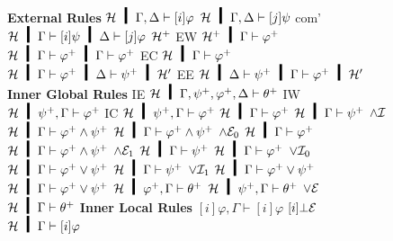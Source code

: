 \begin{figure}
 \small
  \begin{center}
  \textbf{External Rules}
   \vskip 2mm
   \BinaryRule
   {$\hyper\hmid\Gamma,\Delta\vdash[i]\varphi$}
   {$\hyper\hmid\Gamma,\Delta\vdash[j]\psi$}
   {com'}
   {$\hyper\hmid\Gamma\vdash[i]\psi\hmid\Delta\vdash[j]\varphi$}
  \hfill
 \UnaryRule
 {$\mathcal{H}^+$}
 {EW}
 {$\hyper^+\hmid\Gamma\vdash \m\varphi$}
 \vskip 2mm
 \UnaryRule
 {$\hyper\hmid\Gamma\vdash \m\varphi\hmid\Gamma\vdash \m\varphi$}
 {EC}
 {$\hyper\hmid\Gamma\vdash \m\varphi$}
 \hfill
 \UnaryRule
 {$\hyper\hmid\Gamma\vdash \m\varphi\hmid\Delta\vdash \m\psi\hmid \hyper'$}
 {EE}
 {$\hyper\hmid\Delta\vdash \m\psi   \hmid\Gamma\vdash \m\varphi\hmid
   \hyper'$}
 \vskip 2mm
\textbf{Inner Global Rules}
\vskip 2mm
   \UnaryRule{$\hyper\hmid\Gamma,\m\varphi,\m\psi,\Delta\vdash\m\theta$}
   {IE}
   {$\hyper\hmid\Gamma,\m\psi,\m\varphi,\Delta\vdash \m\theta$}
   \hfill
   \UnaryRule{$\hyper\hmid\Gamma\vdash\m\varphi$}
   {IW}
   {$\hyper\hmid\m\psi,\Gamma\vdash\m\varphi$}
   \hfill
   \UnaryRule{$\hyper\hmid\m\psi,\m\psi,\Gamma\vdash\m\varphi$}
   {IC}
   {$\hyper\hmid\m\psi,\Gamma\vdash\m\varphi$}
   \vskip 2mm
  \BinaryRule
   {$\hyper\hmid\Gamma\vdash \m\varphi$}
   {$\hyper\hmid\Gamma\vdash \m\psi$}
   {$\wedge\mathcal I$}
   {$\hyper\hmid\Gamma\vdash \m\varphi\wedge\m\psi$}
   \vskip 2mm
  \UnaryRule
   {$\hyper\hmid\Gamma\vdash \m\varphi\wedge\m\psi$}
   {$\wedge\mathcal E_0$}
   {$\hyper\hmid\Gamma\vdash \m\varphi$}
   \hfill
  \UnaryRule
   {$\hyper\hmid\Gamma\vdash\m\varphi\wedge\m\psi$}
   {$\wedge\mathcal E_1$}
   {$\hyper\hmid\Gamma\vdash\m\psi$}
\vskip 2mm
  \UnaryRule
   {$\hyper\hmid\Gamma\vdash\m\varphi$}
   {$\vee\mathcal I_0$}
   {$\hyper\hmid\Gamma\vdash\m\varphi\vee\m\psi$}
   \hfill
  \UnaryRule
   {$\hyper\hmid\Gamma\vdash\m\psi$}
   {$\vee\mathcal I_1$}
   {$\hyper\hmid\Gamma\vdash\m\varphi\vee\m\psi$}
\vskip 2mm
   \TrinaryRule
   {$\hyper\hmid\Gamma\vdash           \m\varphi\vee\m\psi$}
   {$\hyper\hmid\m\varphi, \Gamma\vdash\m\theta$}
   {$\hyper\hmid\m\psi,    \Gamma\vdash\m\theta$}
   {$\vee\mathcal E$}
   {$\hyper\hmid         \Gamma\vdash\m\theta$}
\vskip 2mm
\textbf{Inner Local Rules}
\vskip 2mm
   {$[i]\varphi,\Gamma\vdash [i]\varphi$}
   \hfill
 \UnaryRule{$\hyper\hmid\Gamma\vdash[i]\bot$}
   {$[i]\bot\mathcal E$}
   {$\hyper\hmid\Gamma\vdash[i]\varphi$}
   \vskip 2mm
  \UnaryRule{$\hyper\hmid[i]\varphi,\Gamma\vdash [i]\psi$}

\end{center}
\end{figure}
